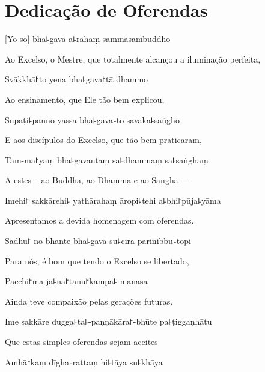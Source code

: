 \chapter{Dedicação de Oferendas}

[Yo so] bha꜕gavā a꜕rahaṃ sammāsambuddho

\begin{english}
Ao Excelso, o Mestre, que totalmente alcançou a iluminação perfeita, 
\end{english}

Svākkhā꜓to yena bha꜕gava꜓tā dhammo

\begin{english}
Ao ensinamento, que Ele tão bem explicou,
\end{english}

Supaṭi꜕panno yassa bha꜕gava꜕to sāvaka꜕saṅgho

\begin{english}
E aos discípulos do Excelso, que tão bem praticaram,
\end{english}

Tam-ma꜓yaṃ bha꜕gavantaṃ sa꜕dhammaṃ sa꜕saṅghaṃ

\begin{english}
A estes – ao Buddha, ao Dhamma e ao Sangha ---
\end{english}

Imehi꜓ sakkārehi꜕ yathārahaṃ āropi꜕tehi a꜕bhi꜓pūja꜕yāma

\begin{english}
Apresentamos a devida homenagem com oferendas.
\end{english}

Sādhu꜓ no bhante bha꜕gavā su꜕cira-parinibbu꜕topi

\begin{english}
Para nós, é bom que tendo o Excelso se libertado,
\end{english}

Pacchi꜓mā-ja꜕na꜓tānu꜓kampa꜕-mānasā

\begin{english}
Ainda teve compaixão pelas gerações futuras.
\end{english}

Ime sakkāre dugga꜕ta꜕-paṇṇākāra꜓-bhūte pa꜕ṭiggaṇhātu

\begin{english}
Que estas simples oferendas sejam aceites
\end{english}

Amhā꜓kaṃ dīgha꜕rattaṃ hi꜕tāya su꜕khāya

